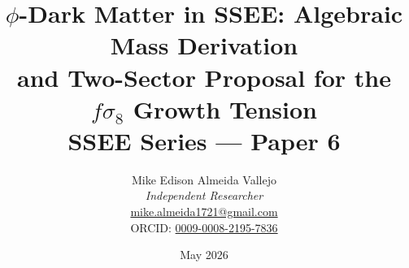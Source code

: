 \documentclass[12pt,a4paper]{article}
\begin{document}
\title{\textbf{$\phi$-Dark Matter in SSEE: Algebraic Mass Derivation\\
and Two-Sector Proposal for the $f\sigma_8$ Growth Tension}\\[4pt]
{\large SSEE Series — Paper 6}}

\author{Mike Edison Almeida Vallejo \\
\small \textit{Independent Researcher} \\
\small \href{mailto:mike.almeida1721@gmail.com}{mike.almeida1721@gmail.com} \\
\small ORCID: \href{https://orcid.org/0009-0008-2195-7836}{0009-0008-2195-7836}
}

\date{May 2026}

\maketitle
\end{document}
